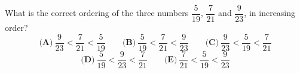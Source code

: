 What is the correct ordering of the three numbers $\dfrac{5}{19}$, $\dfrac{7}{21}$ and $\dfrac{9}{23}$, in increasing order?
\[\textbf{(A)}\ \dfrac{9}{23}<\dfrac{7}{21}<\dfrac{5}{19}\qquad\textbf{(B)}\ \dfrac{5}{19}<\dfrac{7}{21}<\dfrac{9}{23}\qquad\textbf{(C)}\ \dfrac{9}{23}<\dfrac{5}{19}<\dfrac{7}{21}\]
\[\textbf{(D)}\ \dfrac{5}{19}<\dfrac{9}{23}<\dfrac{7}{21}\qquad\textbf{(E)}\ \dfrac{7}{21}<\dfrac{5}{19}<\dfrac{9}{23}\]
